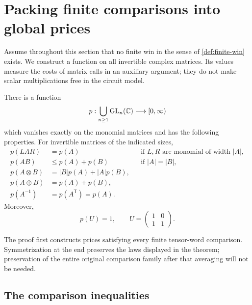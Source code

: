 \section{Packing finite comparisons into global prices}
\label{price:section}

Assume throughout this section that no finite win in the sense of
\cref{def:finite-win} exists.  We construct a function on all invertible
complex matrices.  Its values measure the costs of matrix calls in an
auxiliary argument; they do not make scalar multiplications free in the
circuit model.

\begin{samepage}
\begin{theorem}
\label{thm:prices}
There is a function
\[
 p:\bigcup_{n\geq1}\operatorname{GL}_n(\mathbb C)\longrightarrow[0,\infty)
\]
which vanishes exactly on the monomial matrices and has the following
properties.  For invertible matrices of the indicated sizes,
\begin{align}
 p(LAR)&=p(A)
 &&\text{if $L,R$ are monomial of width $|A|$},
 \label{price:monomial-law}\\
 p(AB)&\leq p(A)+p(B)
 &&\text{if $|A|=|B|$},
 \label{price:product-law}\\
 p(A\otimes B)&=|B|p(A)+|A|p(B),
 \label{price:tensor-law}\\
 p(A\oplus B)&=p(A)+p(B),
 \label{price:sum-law}\\
 p(A^{-1})&=p(A^{\mathsf T})=p(A).
 \label{price:symmetry-law}
\end{align}
Moreover,
\begin{equation}
 p(U)=1,\qquad U=\begin{pmatrix}1&0\\1&1\end{pmatrix}.
 \label{price:normalization}
\end{equation}
\end{theorem}
\end{samepage}

The proof first constructs prices satisfying every finite tensor-word
comparison.  Symmetrization at the end preserves the laws displayed in the
theorem; preservation of the entire original comparison family after that
averaging will not be needed.

\subsection{The comparison inequalities}


